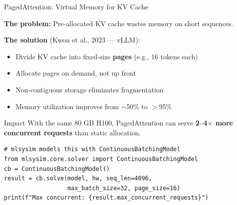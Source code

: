 \documentclass[aspectratio=169, 12pt]{beamer}
\begin{document}
\begin{frame}[fragile]{PagedAttention: Virtual Memory for KV Cache}

\small
\textbf{The problem:} Pre-allocated KV cache wastes memory on short sequences.

\textbf{The solution} (Kwon et al., 2023 --- vLLM):
\begin{itemize}
  \item Divide KV cache into fixed-size \textbf{pages} (e.g., 16 tokens each)
  \item Allocate pages on demand, not up front
  \item Non-contiguous storage eliminates fragmentation
  \item Memory utilization improves from $\sim$50\% to $>$95\%
\end{itemize}

\vspace{0.2cm}
\begin{exampleblock}{Impact}
  With the same 80 GB H100, PagedAttention can serve
  \textbf{2--4$\times$ more concurrent requests} than static allocation.
\end{exampleblock}

\vspace{0.2cm}
\begin{lstlisting}
# mlsysim models this with ContinuousBatchingModel
from mlsysim.core.solver import ContinuousBatchingModel
cb = ContinuousBatchingModel()
result = cb.solve(model, hw, seq_len=4096,
                  max_batch_size=32, page_size=16)
print(f"Max concurrent: {result.max_concurrent_requests}")
\end{lstlisting}
\end{frame}
\end{document}
